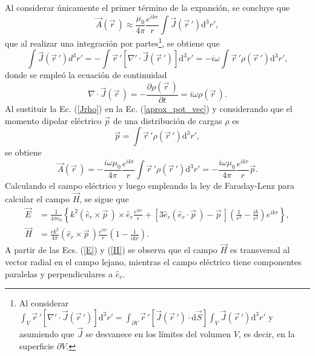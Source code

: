 Al considerar únicamente el primer término de la expansión, se concluye que 
\begin{equation}
    \Vec{A}(\Vec{r}\,)\approx\frac{\mu_0}{4\pi}\frac{e^{ikr}}{r}\int \Vec{J}(\Vec{r}\,') \text{d}^3r',    
    \label{aprox_pot_vec}
\end{equation}
que al realizar una integración por partes\footnote{Al considerar $\int_V \Vec{r}\,'[\nabla'\cdot\Vec{J}(\Vec{r}\,')]\text{d}^3r'=\int_{\partial V} \Vec{r}\,'[\Vec{J}(\Vec{r}\,')\cdot \text{d}\Vec{S}]\int_V \Vec{J}(\Vec{r}\,')\text{d}^3r'$ y asumiendo que $\Vec{J}$ se desvanece en los límites del volumen $V$, es decir, en la superficie $\partial V$. }, se obtiene que
\begin{equation}
	\int\Vec{J}(\vec{r}\,')d^3r'=-\int \Vec{r}\,'[\nabla'\cdot\Vec{J}(\vec{r}\,')]\text{d}^3r'=-i\omega\int \Vec{r}\,'\rho(\Vec{r}\,')\text{d}^3r',
	\label{Jrho}
\end{equation}
donde se empleó la ecuación de continuidad
\begin{equation*}
    \nabla\cdot\Vec{J}(\Vec{r}\,)=-\frac{\partial\rho(\Vec{r}\,)}{\partial t}=i\omega\rho(\Vec{r}\,). 
\end{equation*}
Al sustituir la Ec. (\ref{Jrho}) en la Ec. (\ref{aprox_pot_vec}) y considerando que el momento dipolar eléctrico $\Vec{p}$ de una distribución de cargas $\rho$ es
\begin{equation*}
	\Vec{p}=\int \Vec{r}\,'\rho(\Vec{r}\,')\text{d}^3r',
\end{equation*}
se obtiene \cite{Jackson}
\begin{equation}
    \Vec{A}(\Vec{r}\,)=-\frac{i\omega\mu_0}{4\pi}\frac{e^{ikr}}{r}\int \Vec{r}\,'\rho(\Vec{r}\,')\text{d}^3r'=-\frac{i\omega\mu_0}{4\pi}\frac{e^{ikr}}{r}\Vec{p}. 
    \label{A_dip}  
\end{equation}
Calculando el campo eléctrico y luego empleando la ley de Faraday-Lenz para calcular el campo $\Vec{H}$, se sigue que \cite{Jackson}
\begin{align}
	\Vec{E}&=\frac{1}{4\pi\epsilon_0}\left\{k^2(\hat{e}_r\times\Vec{p}\,)\times\hat{e}_r\frac{e^{ikr}}{r}+[3\hat{e}_r(\hat{e}_r\cdot\Vec{p}\,)-\Vec{p}\,]\left(\frac{1}{r^3}-\frac{ik}{r^2}\right)e^{ikr}\right\},\label{E}\\
    \Vec{H}&=\frac{ck^2}{4\pi}(\hat{e}_r\times\Vec{p}\,)\frac{e^{ikr}}{r}\left(1-\frac{1}{ikr}\right).    \label{H}
\end{align}
A partir de las Ecs. (\ref{E})  y (\ref{H}) se observa que el campo $\Vec{H}$ es transversal al vector radial en el campo lejano, mientras el campo eléctrico tiene componentes paralelas y perpendiculares a $\hat{e}_r$.\\ 

